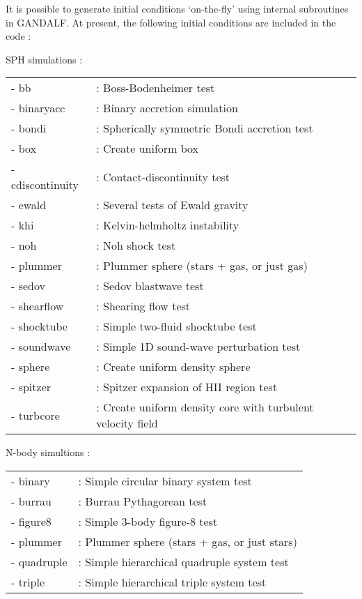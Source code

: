 \documentclass[a4paper]{article}
\begin{document}
It is possible to generate initial conditions `on-the-fly' using internal subroutines in GANDALF.  At present, the following initial conditions are included in the code : \newline

\noindent SPH simulations : \\
\newline
\begin{tabular}{ll}
- bb             &: Boss-Bodenheimer test \\
- binaryacc      &: Binary accretion simulation \\
- bondi          &: Spherically symmetric Bondi accretion test \\
- box            &: Create uniform box \\
- cdiscontinuity &: Contact-discontinuity test \\
- ewald          &: Several tests of Ewald gravity \\
- khi            &: Kelvin-helmholtz instability \\
- noh            &: Noh shock test \\
- plummer        &: Plummer sphere (stars + gas, or just gas) \\
- sedov          &: Sedov blastwave test \\
- shearflow      &: Shearing flow test \\
- shocktube      &: Simple two-fluid shocktube test \\
- soundwave      &: Simple 1D sound-wave perturbation test \\
- sphere         &: Create uniform density sphere \\
- spitzer        &: Spitzer expansion of HII region test \\
- turbcore       &: Create uniform density core with turbulent velocity field
\end{tabular}
\newline
\newline

\noindent N-body simultions : \\
\newline
\begin{tabular}{ll}
- binary    &: Simple circular binary system test \\
- burrau    &: Burrau Pythagorean test \\
- figure8   &: Simple 3-body figure-8 test \\
- plummer   &: Plummer sphere (stars + gas, or just stars) \\
- quadruple &: Simple hierarchical quadruple system test \\
- triple    &: Simple hierarchical triple system test
\end{tabular}
\end{document}

